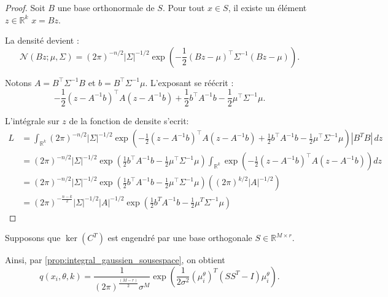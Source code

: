 \documentclass[a4paper,10pt]{article}
\theoremstyle{definition} %
\theoremstyle{definition} %
\theoremstyle{definition} %
\theoremstyle{definition} %
\newcommand{\R}{\mathbb{R}}
\begin{document}
\begin{proof}

Soit \( B \) une base orthonormale de \( S \). Pour tout \( x \in S \), il existe un élément$z \in \R^k$ \( x = Bz \).

La densité devient :
\begin{equation*}
\mathcal{N}(Bz; \mu, \Sigma) = (2\pi)^{-n/2} |\Sigma|^{-1/2} \exp\left(-\frac{1}{2} (Bz - \mu)^\top \Sigma^{-1} (Bz - \mu)\right).    
\end{equation*}


Notons \( A = B^\top \Sigma^{-1} B \) et \( b = B^\top \Sigma^{-1} \mu \). L'exposant se réécrit :
\begin{equation*}
-\frac{1}{2} (z - A^{-1}b)^\top A (z - A^{-1}b) + \frac{1}{2} b^\top A^{-1} b - \frac{1}{2} \mu^\top \Sigma^{-1} \mu.    
\end{equation*}


L'intégrale sur \( z \) de la fonction de densite s'ecrit:
\begin{align*}
 L &=\int_{\R^k} (2\pi)^{-n/2} |\Sigma|^{-1/2} \exp\left(-\frac{1}{2} (z - A^{-1}b)^\top A (z - A^{-1}b) + \frac{1}{2} b^\top A^{-1} b - \frac{1}{2} \mu^\top \Sigma^{-1} \mu\right) |B^T B| \,dz\\
 &= (2\pi)^{-n/2} |\Sigma|^{-1/2} \exp\left(\frac{1}{2} b^\top A^{-1} b - \frac{1}{2} \mu^\top \Sigma^{-1} \mu\right) \int_{\R^k}  \exp\left(-\frac{1}{2} (z - A^{-1}b)^\top A (z - A^{-1}b) \right) dz \\
 &= (2\pi)^{-n/2} |\Sigma|^{-1/2} \exp\left(\frac{1}{2} b^\top A^{-1} b - \frac{1}{2} \mu^\top \Sigma^{-1} \mu\right) \left( (2\pi)^{k/2} |A|^{-1/2}\right)\\
 &= (2\pi)^{-\frac{n - k}{2}} |\Sigma|^{-1/2} |A|^{-1/2} \exp\left(\frac{1}{2} b^TA^{-1}b - \frac{1}{2}\mu^T \Sigma^{-1}\mu\right)
\end{align*}

\end{proof}

Supposons que $\ker(C^T)$ est engendré par une base orthogonale $S \in \mathbb{R}^{M \times r}$.


Ainsi, par \cref{prop:integral_gaussien_sousespace}, on obtient
\begin{equation*}
    q(x_i, \theta, k) = \frac{1}{(2\pi)^\frac{(M-r)}{2} \sigma^M} \exp\left(\frac{1}{2\sigma^2} (\mu_i^\theta)^T (SS^T - I) \mu_i^\theta\right).
\end{equation*}
\end{document}
